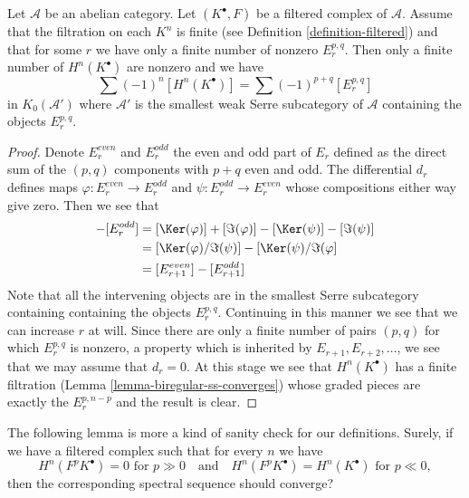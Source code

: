 \begin{lemma}
\label{lemma-biregular-ss-relation-in-K0}
Let $\mathcal{A}$ be an abelian category. Let $(K^\bullet, F)$ be a
filtered complex of $\mathcal{A}$. Assume that the filtration on each $K^n$
is finite (see Definition \ref{definition-filtered}) and that for some
$r$ we have only a finite number of nonzero $E_r^{p, q}$. Then
only a finite number of $H^n(K^\bullet)$ are nonzero and we have
$$
\sum (-1)^n[H^n(K^\bullet)] = \sum (-1)^{p + q} [E_r^{p, q}]
$$
in $K_0(\mathcal{A}')$ where $\mathcal{A}'$ is the smallest weak
Serre subcategory of $\mathcal{A}$ containing the objects
$E_r^{p, q}$.
\end{lemma}

\begin{proof}
Denote $E_r^{even}$ and $E_r^{odd}$ the even and odd part of $E_r$
defined as the direct sum of the $(p, q)$ components with $p + q$ even
and odd. The differential $d_r$ defines maps
$\varphi : E_r^{even} \to E_r^{odd}$ and $\psi : E_r^{odd} \to E_r^{even}$
whose compositions either way give zero.
Then we see that
\begin{align*}
[E_r^{even}] - [E_r^{odd}] & =
[\Ker(\varphi)] + [\Im(\varphi)] - [\Ker(\psi)] - [\Im(\psi)] \\
& =
[\Ker(\varphi)/\Im(\psi)] - [\Ker(\psi)/\Im(\varphi] \\
& =
[E_{r + 1}^{even}] - [E_{r + 1}^{odd}]
\end{align*}
Note that all the intervening objects are in the smallest Serre
subcategory containing containing the objects $E_r^{p, q}$.
Continuing in this manner we see that we can increase $r$ at will.
Since there are only a finite number of pairs $(p, q)$ for which
$E_r^{p, q}$ is nonzero, a property which is inherited by
$E_{r + 1}, E_{r + 2}, \ldots$, we see that we may assume that $d_r = 0$.
At this stage we see that $H^n(K^\bullet)$ has a finite filtration
(Lemma \ref{lemma-biregular-ss-converges}) whose graded pieces
are exactly the $E_r^{p, n - p}$ and the result is clear.
\end{proof}

\noindent
The following lemma is more a kind of sanity check for our definitions.
Surely, if we have a filtered complex such that for every $n$ we have
$$
H^n(F^pK^\bullet) = 0\text{ for }p \gg 0
\quad\text{and}\quad
H^n(F^pK^\bullet) = H^n(K^\bullet)\text{ for }p \ll 0,
$$
then the corresponding spectral sequence should converge?

